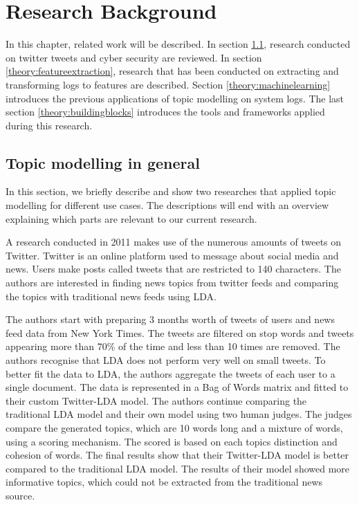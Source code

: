 \chapter{Research Background}  \label{ch:theory}

\begin{comment}
\section{definitions}
\end{comment}

In this chapter, related work will be described. In section \ref{theory:relatedwork}, research conducted on twitter tweets and cyber security are reviewed. In section \ref{theory:featureextraction}, research that has been conducted on extracting and transforming logs to features are described. Section \ref{theory:machinelearning} introduces the previous applications of topic modelling on system logs. The last section \ref{theory:buildingblocks} introduces the tools and frameworks applied during this research.

\section{Topic modelling in general} \label{theory:relatedwork}
In this section, we briefly describe and show two researches that applied topic modelling for different use cases. The descriptions will end with an overview explaining which parts are relevant to our current research. \par

\setlength{\parindent}{3ex} A research conducted in 2011 makes use of the numerous amounts of tweets on Twitter. Twitter is an online platform used to message about social media and news. Users make posts called tweets that are restricted to 140 characters. The authors are interested in finding news topics from twitter feeds and comparing the topics with traditional news feeds using LDA.

The authors start with preparing 3 months worth of tweets of users and news feed data from New York Times. The tweets are filtered on stop words and tweets appearing more than 70\% of the time and less than 10 times are removed. The authors recognise that LDA does not perform very well on small tweets. To better fit the data to LDA, the authors aggregate the tweets of each user to a single document. The data is represented in a Bag of Words matrix and fitted to their custom Twitter-LDA model. The authors continue comparing the traditional LDA model and their own model using two human judges. The judges compare the generated topics, which are 10 words long and a mixture of words, using a scoring mechanism. The scored is based on each topics distinction and cohesion of words. The final results show that their Twitter-LDA model is better compared to the traditional LDA model. The results of their model showed more informative topics, which could  not be extracted from the traditional news source. \cite{Zhao2011ComparingModels}

